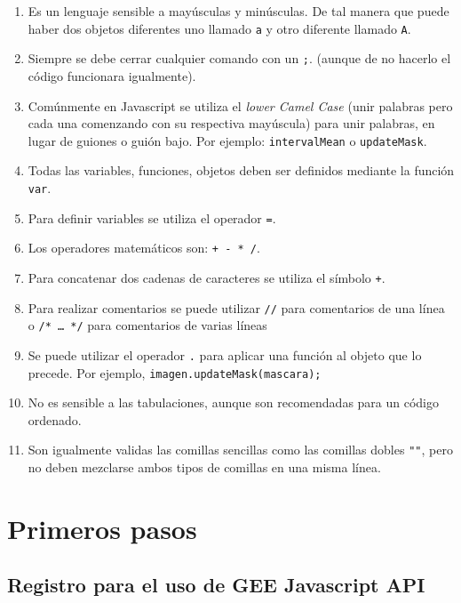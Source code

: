 \documentclass[
]{article}
\providecommand{\tightlist}{%
  \setlength{\itemsep}{0pt}\setlength{\parskip}{0pt}}
\begin{document}
\begin{enumerate}
\def\labelenumi{\arabic{enumi}.}
\tightlist
\item
  Es un lenguaje sensible a mayúsculas y minúsculas. De tal manera que
  puede haber dos objetos diferentes uno llamado \texttt{a} y otro
  diferente llamado \texttt{A}.
\item
  Siempre se debe cerrar cualquier comando con un \texttt{;}. (aunque de
  no hacerlo el código funcionara igualmente).
\item
  Comúnmente en Javascript se utiliza el \emph{lower Camel Case} (unir
  palabras pero cada una comenzando con su respectiva mayúscula) para
  unir palabras, en lugar de guiones o guión bajo. Por ejemplo:
  \texttt{intervalMean} o \texttt{updateMask}.
\item
  Todas las variables, funciones, objetos deben ser definidos mediante
  la función \texttt{var}.
\item
  Para definir variables se utiliza el operador \texttt{=}.
\item
  Los operadores matemáticos son: \texttt{+\ -\ *\ /}.
\item
  Para concatenar dos cadenas de caracteres se utiliza el símbolo
  \texttt{+}.
\item
  Para realizar comentarios se puede utilizar \texttt{//} para
  comentarios de una línea o \texttt{/*\ \ldots{}\ */} para comentarios
  de varias líneas
\item
  Se puede utilizar el operador \texttt{.} para aplicar una función al
  objeto que lo precede. Por ejemplo,
  \texttt{imagen.updateMask(mascara);}
\item
  No es sensible a las tabulaciones, aunque son recomendadas para un
  código ordenado.
\item
  Son igualmente validas las comillas sencillas
  \texttt{\textquotesingle{}\textquotesingle{}} como las comillas dobles
  \texttt{""}, pero no deben mezclarse ambos tipos de comillas en una
  misma línea.
\end{enumerate}

\newpage

\hypertarget{primeros-pasos}{%
\section{Primeros pasos}\label{primeros-pasos}}

\hypertarget{registro-para-el-uso-de-gee-javascript-api}{%
\subsection{Registro para el uso de GEE Javascript
API}\label{registro-para-el-uso-de-gee-javascript-api}}
\end{document}
